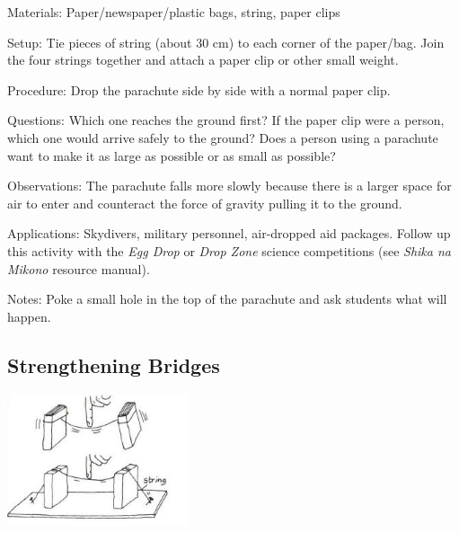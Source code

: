 \begin{multicols}{2}
\begin{description*}
\item[Materials:]{Paper/newspaper/plastic bags, string, paper clips}
\item[Setup:]{Tie pieces of string (about 30 cm) to each corner of the paper/bag. Join the four strings together and attach a paper clip or other small weight.}
\item[Procedure:]{Drop the parachute side by side with a normal paper clip.}
\item[Questions:]{Which one reaches the ground first? If the paper clip were a person, which one would arrive safely to the ground? Does a person using a parachute want to make it as large as possible or as small as possible?}
\item[Observations:]{The parachute falls more slowly because there is a larger space for air to enter and counteract the force of gravity pulling it to the ground.}
\item[Applications:]{Skydivers, military personnel, air-dropped aid packages. Follow up this activity with the \emph{Egg Drop} or \emph{Drop Zone} science competitions (see \emph{Shika na Mikono} resource manual).}
\item[Notes:]{Poke a small hole in the top of the parachute and ask students what will happen.}
\end{description*}

\subsection{Strengthening Bridges}

\begin{center}
\includegraphics[width=0.4\textwidth]{./img/vso/strengthening-bridges.jpg}
\end{center}


\end{multicols}
